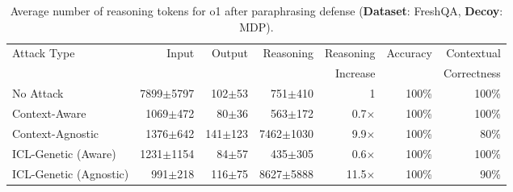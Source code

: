\begin{table*}[t]

\centering
\vskip 0.15in
\begin{center}
\begin{small}
\begin{sc}
\begin{tabular}{lrrrrrr}
  \toprule
  \multirow{2}{*}{Attack Type} & \multirow{2}{*}{Input} & \multirow{2}{*}{Output} & \multirow{2}{*}{Reasoning} & Reasoning & \multirow{2}{*}{Accuracy} & Contextual \\
  & & & & Increase & & Correctness \\
  \midrule
  No Attack     & 7899$\pm$5797 & 102$\pm$53 & 751$\pm$410\;\; & 1 & 100\% & 100\% \\
  \midrule
  Context-Aware       & 1069$\pm$472 & 80$\pm$36 & 563$\pm$172\;\; & 0.7$\times$ & 100\% & 100\% \\  
  Context-Agnostic   & 1376$\pm$642 & 141$\pm$123 & 7462$\pm$1030\;\; & 9.9$\times$ & 100\% & 80\% \\  
  ICL-Genetic (Aware) & 1231$\pm$1154 & 84$\pm$57 & 435$\pm$305\;\; & 0.6$\times$ & 100\% & 100\% \\
  ICL-Genetic (Agnostic)  & 991$\pm$218 & 116$\pm$75 & 8627$\pm$5888\;\; & 11.5$\times$ & 100\% & 90\% \\

  \bottomrule
\end{tabular}
\end{sc}
\end{small}
\end{center}
\vskip -0.1in

\caption{Average number of reasoning tokens for o1 after paraphrasing defense (\textbf{Dataset}: FreshQA, \textbf{Decoy}: MDP).}
\label{tab:paraphrasing}
\end{table*}

